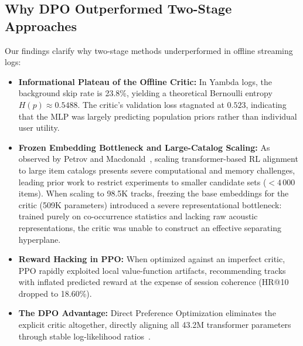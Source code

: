 \subsection{Why DPO Outperformed Two-Stage Approaches}
Our findings clarify why two-stage methods underperformed in offline streaming logs:
\begin{itemize}
    \item \textbf{Informational Plateau of the Offline Critic:} In Yambda logs, the background skip rate is 23.8\%, yielding a theoretical Bernoulli entropy $H(p) \approx 0.5488$. The critic's validation loss stagnated at $0.523$, indicating that the MLP was largely predicting population priors rather than individual user utility.
    \item \textbf{Frozen Embedding Bottleneck and Large-Catalog Scaling:} As observed by Petrov and Macdonald~\cite{petrov2024aligning}, scaling transformer-based RL alignment to large item catalogs presents severe computational and memory challenges, leading prior work to restrict experiments to smaller candidate sets ($<4\,000$ items). When scaling to 98.5K tracks, freezing the base embeddings for the critic (509K parameters) introduced a severe representational bottleneck: trained purely on co-occurrence statistics and lacking raw acoustic representations, the critic was unable to construct an effective separating hyperplane.
    \item \textbf{Reward Hacking in PPO:} When optimized against an imperfect critic, PPO rapidly exploited local value-function artifacts, recommending tracks with inflated predicted reward at the expense of session coherence (HR@10 dropped to 18.60\%).
    \item \textbf{The DPO Advantage:} Direct Preference Optimization eliminates the explicit critic altogether, directly aligning all 43.2M transformer parameters through stable log-likelihood ratios~\cite{rafailov2023direct}.
\end{itemize}

